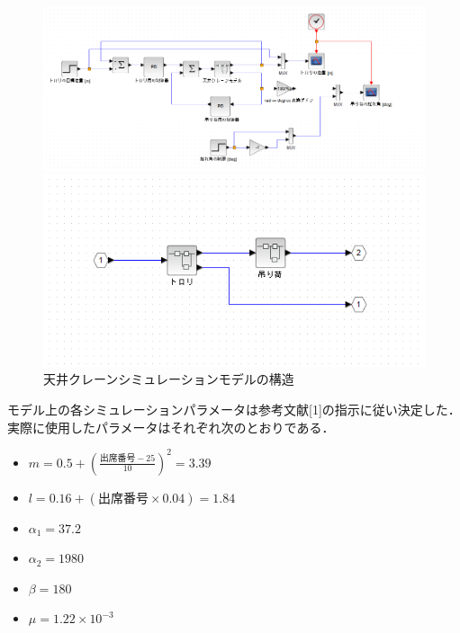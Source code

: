 \documentclass[dvipdfmx,titlepage,a4j]{jsarticle}  %
\begin{document}
\begin{figure}[H]
  \begin{minipage}{10cm}
    \centering
    \includegraphics[keepaspectratio, scale=0.35]{../graph/ex-model.png}
  \end{minipage}
  \hfill
  \begin{minipage}{6cm}
    \centering
    \includegraphics[keepaspectratio, scale=0.4]{../graph/ex-model-2.png}
  \end{minipage}
  \caption{天井クレーンシミュレーションモデルの構造}
  \label{fig:crane:model1}
\end{figure}

モデル上の各シミュレーションパラメータは参考文献[1]の指示に従い決定した．
実際に使用したパラメータはそれぞれ次のとおりである．
\begin{itemize}
  \item $m = 0.5 + (\frac{出席番号 - 25}{10})^2 = 3.39$
  \item $l = 0.16 + (出席番号 \times 0.04) = 1.84$
  \item $\alpha_1 = 37.2$
  \item $\alpha_2 = 1980$
  \item $\beta = 180$
  \item $\mu = 1.22 \times  10^{-3}$
\end{itemize}
\end{document}
